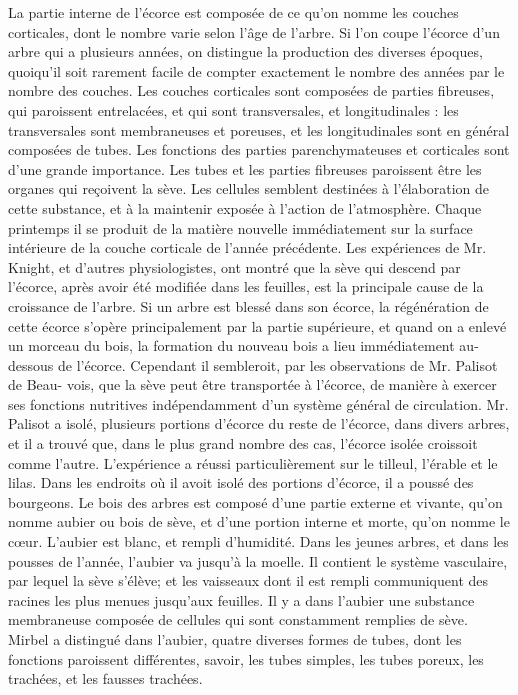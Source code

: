 La partie interne de l'écorce est composée de ce qu'on nomme les couches corticales, dont le nombre varie selon l'âge de l'arbre. Si l'on coupe l'écorce d'un arbre qui a plusieurs années, on distingue la production des diverses époques, quoiqu'il soit rarement facile de compter exactement le nombre des années par le nombre des couches.\setcounter{page}{377} Les couches corticales sont composées de parties fibreuses, qui paroissent entrelacées, et qui sont transversales, et longitudinales : les transversales sont membraneuses et poreuses, et les longitudinales sont en général composées de tubes.
Les fonctions des parties parenchymateuses et corticales sont d'une grande importance. Les tubes et les parties fibreuses paroissent être les organes qui reçoivent la sève. Les cellules semblent destinées à l'élaboration de cette substance, et à la maintenir exposée à l'action de l'atmosphère. Chaque printemps il se produit de la matière nouvelle immédiatement sur la surface intérieure de la couche corticale de l'année précédente.
Les expériences de Mr. Knight, et d'autres physiologistes, ont montré que la sève qui descend par l'écorce, après avoir été modifiée dans les feuilles, est la principale cause de la croissance de l'arbre. Si un arbre est blessé dans son écorce, la régénération de cette écorce s'opère principalement par la partie supérieure, et quand on a enlevé un morceau du bois, la formation du nouveau bois a lieu immédiatement au-dessous de l'écorce. Cependant il sembleroit, par les observations de Mr. Palisot de Beau-\setcounter{page}{378} vois, que la sève peut être transportée à l'écorce, de manière à exercer ses fonctions nutritives indépendamment d'un système général de circulation. Mr. Palisot a isolé, plusieurs portions d'écorce du reste de l'écorce, dans divers arbres, et il a trouvé que, dans le plus grand nombre des cas, l'écorce isolée croissoit comme l'autre. L'expérience a réussi particulièrement sur le tilleul, l'érable et le lilas. Dans les endroits où il avoit isolé des portions d'écorce, il a poussé des bourgeons.
Le bois des arbres est composé d'une partie externe et vivante, qu'on nomme aubier ou bois de sève, et d'une portion interne et morte, qu'on nomme le cœur. L'aubier est blanc, et rempli d'humidité. Dans les jeunes arbres, et dans les pousses de l'année, l'aubier va jusqu'à la moelle. Il contient le système vasculaire, par lequel la sève s'élève; et les vaisseaux dont il est rempli communiquent des racines les plus menues jusqu'aux feuilles.
Il y a dans l'aubier une substance membraneuse composée de cellules qui sont constamment remplies de sève. Mirbel a distingué dans l'aubier, quatre diverses formes de tubes, dont les fonctions paroissent différentes, savoir, les tubes simples, les tubes\setcounter{page}{379} poreux, les trachées, et les fausses trachées.
